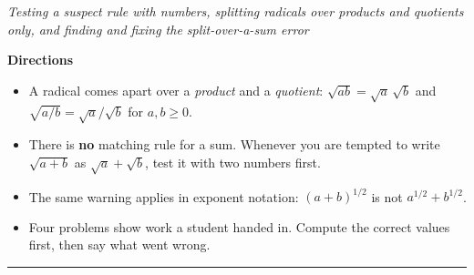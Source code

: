 \documentclass[12pt]{article}
\begin{document}

\begin{center}
\textit{Testing a suspect rule with numbers, splitting radicals over products and quotients only, and finding and fixing the split-over-a-sum error}
\end{center}

\noindent\textbf{Directions}
\begin{itemize}[leftmargin=1.1cm, itemsep=1pt, topsep=3pt]
  \item A radical comes apart over a \emph{product} and a \emph{quotient}: $\sqrt{ab} = \sqrt{a}\,\sqrt{b}$ and $\sqrt{a/b} = \sqrt{a}/\sqrt{b}$ for $a, b \ge 0$.
  \item There is \textbf{no} matching rule for a sum. Whenever you are tempted to write $\sqrt{a+b}$ as $\sqrt{a}+\sqrt{b}$, test it with two numbers first.
  \item The same warning applies in exponent notation: $(a+b)^{1/2}$ is not $a^{1/2}+b^{1/2}$.
  \item Four problems show work a student handed in. Compute the correct values first, then say what went wrong.
\end{itemize}

\vspace{0.2cm}
\noindent\rule{\linewidth}{0.4pt}



\end{document}
